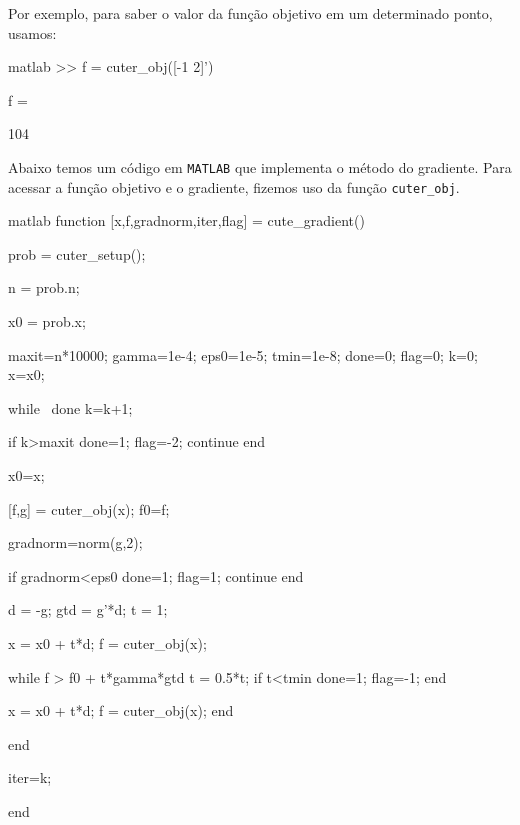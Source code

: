 Por exemplo, para saber o valor da fun\c{c}\~ao objetivo em um determinado ponto, usamos:
\begin{code}{matlab}
>> f = cuter_obj([-1 2]')

f =

   104
\end{code}
Abaixo temos um c\'odigo em {\tt MATLAB} que implementa o m\'etodo do gradiente. Para acessar a 
fun\c{c}\~ao objetivo e o gradiente, fizemos uso da fun\c{c}\~ao {\tt cuter\_obj}.
\begin{code}{matlab}
function [x,f,gradnorm,iter,flag] = cute_gradient()
%
%
%

    prob = cuter_setup();
    
    n = prob.n;
    
    x0 = prob.x;
    
    maxit=n*10000;
    gamma=1e-4;
    eps0=1e-5;
    tmin=1e-8;
    done=0;
    flag=0;
    k=0;
    x=x0;
    
    while ~done
        k=k+1;
        
        if k>maxit
           done=1;
           flag=-2;
           continue
        end
        
        x0=x;
        
        [f,g] = cuter_obj(x);
        f0=f;
        
        gradnorm=norm(g,2);
        
        if gradnorm<eps0
            done=1;
            flag=1;
            continue
        end
        
        d = -g;
        gtd = g'*d;
        t = 1;
        
        x = x0 + t*d;
        f = cuter_obj(x);
        
        while f > f0 + t*gamma*gtd
            t = 0.5*t;
            if t<tmin
                done=1;
                flag=-1;
            end
            
            x = x0 + t*d;
            f = cuter_obj(x);
        end
        
    end
    
    iter=k;

end
\end{code}
